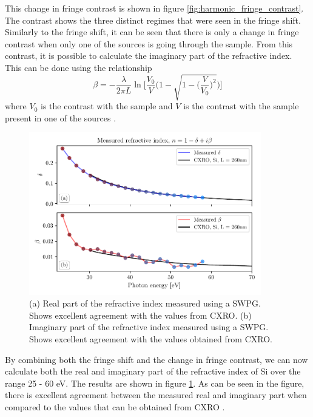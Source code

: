 This change in fringe contrast is shown in figure \ref{fig:harmonic_fringe_contrast}.  The contrast shows the three distinct regimes that were seen in the fringe shift.  Similarly to the fringe shift, it can be seen that there is only a change in fringe contrast when only one of the sources is going through the sample.  From this contrast, it is possible to calculate the imaginary part of the refractive index.  This can be done using the relationship
\begin{equation}
\label{eqn:beta_fringe_contrast}
	\beta = -\frac{\lambda}{2\pi L}\ln\Bigg[\frac{V_0}{V}\Bigg(1-\sqrt{1-\bigg(\frac{V}{V_0}\bigg)^2}\Bigg)\Bigg]
\end{equation} 
where $V_0$ is the contrast with the sample and $V$ is the contrast with the sample present in one of the sources \cite{hemmersMulticolorXUVInterferometry2009}.

\begin{figure}
	\centering
	\includegraphics[width=0.9\textwidth]{figures/refractive_index/db_cxro.pdf}
	\caption[Measured real and imaginary part of the refractive index of Si]{(a) Real part of the refractive index measured using a SWPG.  Shows excellent agreement with the values from CXRO. (b) Imaginary part of the refractive index measured using a SWPG. Shows excellent agreement with the values obtained from CXRO.}
	\label{fig:measured_delta_beta}
\end{figure}
By combining both the fringe shift and the change in fringe contrast, we can now calculate both the real and imaginary part of the refractive index of Si over the range 25 - 60 eV.  The results are shown in figure \ref{fig:measured_delta_beta}.  As can be seen in the figure, there is excellent agreement between the measured real and imaginary part when compared to the values that can be obtained from CXRO \cite{henkeXRayInteractionsPhotoabsorption1993}.


